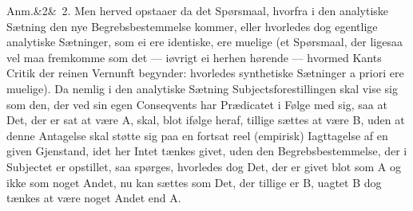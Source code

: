 \documentclass[12pt]{book}
\def\sperr#1{#1}%
\def\textit#1{#1}%
\newcommand{\sperr}[1]{\textls[180]{#1}}
\newcommand{\anm}[1]{%
  \par\vspace{0.5\baselineskip}%
  \noindent\hspace{\parindent}\sperr{Anm.}\ifx&#1&\else~\textit{#1}.\fi
  \enspace\ignorespaces
}
\begin{document}
\anm{2} Men herved opstaaer da det Spørsmaal, hvorfra i den analytiske Sætning
den nye Begrebsbestemmelse kommer, eller hvorledes dog egentlige analytiske
Sætninger, som ei ere identiske, ere muelige (et Spørsmaal, der ligesaa vel maa
fremkomme som det --- iøvrigt ei herhen hørende --- hvormed Kants Critik der
reinen Vernunft begynder: hvorledes synthetiske Sætninger \textit{a priori} ere
muelige). Da nemlig i den analytiske Sætning Subjectsforestillingen skal vise
sig som den, der ved sin egen Conseqvents har Prædicatet i Følge med sig, saa at
Det, der er sat at være \textit{A}, skal, blot ifølge heraf, tillige sættes at
være \textit{B}, uden at denne Antagelse skal støtte sig paa en fortsat reel
(empirisk) Iagttagelse af en given Gjenstand, idet her Intet tænkes givet, uden
den Begrebsbestemmelse, der i Subjectet er opstillet, saa spørges, hvorledes dog
Det, der er givet blot som \textit{A} og ikke som noget Andet, nu kan sættes som
Det, der tillige er \textit{B}, uagtet \textit{B} dog tænkes at være noget Andet
end \textit{A}.
\end{document}
